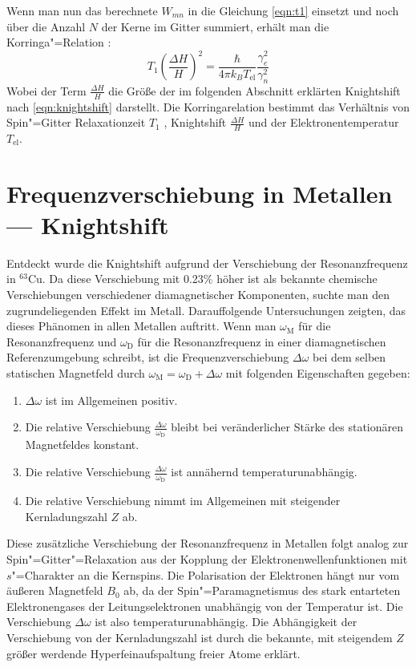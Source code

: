 Wenn man nun das berechnete $W_{mn}$ in die Gleichung \eqref{eqn:t1} einsetzt und noch über die
Anzahl $N$ der Kerne im Gitter summiert, erhält man die Korringa"=Relation \cite{Korringa}:
\begin{equation}
	\label{eqn:korringa}
	T_1\left(\frac{\Delta H}{H}\right)^2=\frac{\hbar}{4\pi k_BT_\mathrm{el}}\frac{\gamma_e^2}{\gamma_n^2}
\end{equation}
Wobei der Term $\frac{\Delta H}{H}$ die Größe der im folgenden Abschnitt erklärten Knightshift
nach \eqref{eqn:knightshift} darstellt. Die Korringarelation bestimmt das Verhältnis
von Spin"=Gitter Relaxationzeit $T_1$ , Knightshift $\frac{\Delta H}{H}$ und der
Elektronentemperatur $T_\mathrm{el}$.


\section{Frequenzverschiebung in Metallen --- Knightshift}
Entdeckt wurde die Knightshift aufgrund der Verschiebung der Resonanzfrequenz in $^{63}$Cu. Da
diese Verschiebung mit 0.23\% höher ist als bekannte chemische Verschiebungen verschiedener
diamagnetischer Komponenten, suchte man den zugrundeliegenden Effekt im Metall. Darauffolgende
Untersuchungen zeigten, das dieses Phänomen in allen Metallen auftritt. Wenn man
$\omega_\mathrm{M}$ für die Resonanzfrequenz und $\omega_\mathrm{D}$ für die Resonanzfrequenz in
einer diamagnetischen Referenzumgebung schreibt, ist die Frequenzverschiebung $\Delta\omega$ bei dem
selben statischen Magnetfeld durch $\omega_\mathrm{M} = \omega_\mathrm{D} + \Delta\omega$
mit folgenden Eigenschaften gegeben:
	\begin{enumerate}
		\item $\Delta\omega$ ist im Allgemeinen positiv.
		\item Die relative Verschiebung $\frac{\Delta\omega}{\omega_\mathrm{D}}$ bleibt bei
			veränderlicher Stärke des stationären Magnetfeldes konstant.
		\item Die relative Verschiebung $\frac{\Delta\omega}{\omega_\mathrm{D}}$ ist annähernd
			temperaturunabhängig.
		\item Die relative Verschiebung nimmt im Allgemeinen mit steigender Kernladungszahl $Z$
			ab.
	\end{enumerate}

Diese zusätzliche Verschiebung der Resonanzfrequenz in Metallen folgt analog zur
Spin"=Gitter"=Relaxation aus der Kopplung der Elektronenwellenfunktionen mit $s$"=Charakter an die
Kernspins. Die Polarisation der Elektronen hängt nur vom äußeren Magnetfeld $B_0$ ab, da der
Spin"=Paramagnetismus des stark entarteten Elektronengases der Leitungselektronen unabhängig von
der Temperatur ist. Die Verschiebung $\Delta\omega$ ist also temperaturunabhängig. Die
Abhängigkeit der Verschiebung von der Kernladungszahl ist durch die bekannte, mit steigendem $Z$
größer werdende Hyperfeinaufspaltung freier Atome erklärt.

